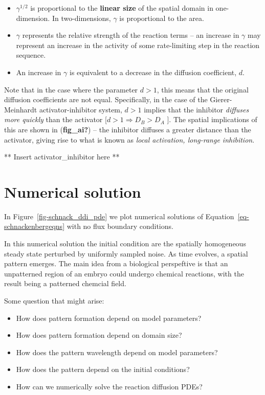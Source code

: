 \documentclass[
  letterpaper,
  DIV=11,
  numbers=noendperiod]{scrreprt}
\providecommand{\tightlist}{%
  \setlength{\itemsep}{0pt}\setlength{\parskip}{0pt}}\usepackage{longtable,booktabs,array}
\theoremstyle{definition}
\theoremstyle{plain}
\theoremstyle{plain}
\theoremstyle{remark}
\begin{document}
\begin{itemize}
\tightlist
\item
  \(\gamma^{1/2}\) is proportional to the \textbf{linear size} of the
  spatial domain in one-dimension. In two-dimensions, \(\gamma\) is
  proportional to the area.
\item
  \(\gamma\) represents the relative strength of the reaction terms --
  an increase in \(\gamma\) may represent an increase in the activity of
  some rate-limiting step in the reaction sequence.
\item
  An increase in \(\gamma\) is equivalent to a decrease in the diffusion
  coefficient, \(d\).
\end{itemize}

Note that in the case where the parameter \(d > 1\), this means that the
original diffusion coefficients are not equal. Specifically, in the case
of the Gierer-Meinhardt activator-inhibitor system, \(d >1\) implies
that the inhibitor \emph{diffuses more quickly} than the activator
{[}\(d > 1 \Rightarrow D_B > D_A\) {]}. The spatial implications of this
are shown in (\textbf{fig\_ai?}) -- the inhibitor diffuses a greater
distance than the activator, giving rise to what is known as \emph{local
activation, long-range inhibition}.

** Insert activator\_inhibitor here **

\hypertarget{numerical-solution-1}{%
\section{Numerical solution}\label{numerical-solution-1}}

In Figure~\ref{fig-schnack_ddi_pde} we plot numerical solutions of
Equation~\ref{eq-schnackenbergeqns} with no flux boundary conditions.

In this numerical solution the initial condition are the spatially
homogeneous steady state perturbed by uniformly sampled noise. As time
evolves, a spatial pattern emerges. The main idea from a biological
perspeftive is that an unpatterned region of an embryo could undergo
chemical reactions, with the result being a patterned chemcial field.

Some question that might arise:

\begin{itemize}
\tightlist
\item
  How does pattern formation depend on model parameters?
\item
  How does pattern formation depend on domain size?
\item
  How does the pattern wavelength depend on model parameters?
\item
  How does the pattern depend on the initial conditions?
\item
  How can we numerically solve the reaction diffusion PDEs?
\end{itemize}
\end{document}
